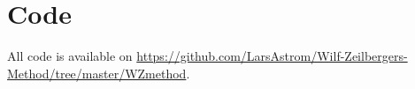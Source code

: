 \section{Code}
All code is available on \url{https://github.com/LarsAstrom/Wilf-Zeilbergers-Method/tree/master/WZmethod}.
